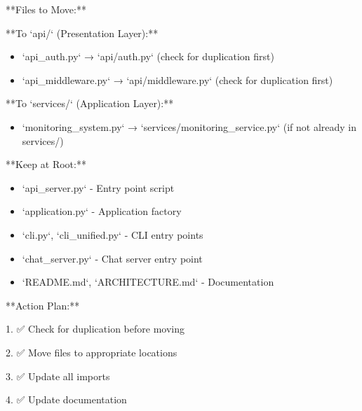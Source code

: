 \documentclass[11pt,a4paper]{article}
\begin{document}
**Files to Move:**

**To `api/` (Presentation Layer):**

\begin{itemize}
\item `api_auth.py` → `api/auth.py` (check for duplication first)
\end{itemize}

\begin{itemize}
\item `api_middleware.py` → `api/middleware.py` (check for duplication first)
\end{itemize}

**To `services/` (Application Layer):**

\begin{itemize}
\item `monitoring_system.py` → `services/monitoring_service.py` (if not already in services/)
\end{itemize}

**Keep at Root:**

\begin{itemize}
\item `api_server.py` - Entry point script
\end{itemize}

\begin{itemize}
\item `application.py` - Application factory
\end{itemize}

\begin{itemize}
\item `cli.py`, `cli_unified.py` - CLI entry points
\end{itemize}

\begin{itemize}
\item `chat_server.py` - Chat server entry point
\end{itemize}

\begin{itemize}
\item `README.md`, `ARCHITECTURE.md` - Documentation
\end{itemize}

**Action Plan:**

1. ✅ Check for duplication before moving

2. ✅ Move files to appropriate locations

3. ✅ Update all imports

4. ✅ Update documentation
\end{document}
